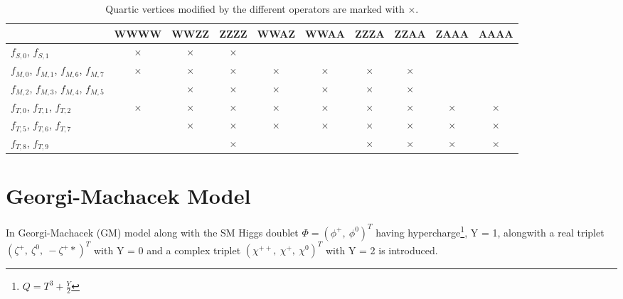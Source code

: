 \begin{table}
\centering
\begin{tabular}[!htbp]{|p{1.8cm} | c  |c  |c  |c  |c  |c  |c | c  |c |}
\hline
    & WWWW & WWZZ & ZZZZ & WWAZ & WWAA & ZZZA & ZZAA & ZAAA & AAAA \\
\hline
$f_{S,0}$, $f_{S,1}$ &$\times$ & $\times$&$\times$ & & & & & & \\
\hline
$f_{M,0}$, $f_{M,1}$, $f_{M,6}$, $f_{M,7}$  &$\times$ &$\times$ &$\times$ &$\times$ &$\times$ &$\times$ &$\times$ & & \\
\hline
$f_{M,2}$, $f_{M,3}$, $f_{M,4}$, $f_{M,5}$  & &$\times$ &$\times$ &$\times$ &$\times$ &$\times$ &$\times$ & & \\
\hline
$f_{T,0}$, $f_{T,1}$, $f_{T,2}$ &$\times$ &$\times$ &$\times$ &$\times$ &$\times$ &$\times$ &$\times$ &$\times$ &$\times$ \\
\hline
$f_{T,5}$, $f_{T,6}$, $f_{T,7}$ & &$\times$ &$\times$ &$\times$ &$\times$ &$\times$ &$\times$ &$\times$ &$\times$ \\
\hline
$f_{T,8}$, $f_{T,9}$  & & &$\times$ & & &$\times$ &$\times$ &$\times$ &$\times$ \\
\hline
\end{tabular}
\caption{Quartic vertices modified by the different operators are marked with $\times$.}
\label{table:aQGC_alloperator}
\end{table}




\section{Georgi-Machacek Model} %
\label{sec:georgi_machacek_model}
In Georgi-Machacek (GM) model along with the SM Higgs doublet $\Phi = (\phi^+,~\phi^0)^T$ having hypercharge\footnote{$Q = T^3 + \frac{Y}{2}$}, Y = 1, alongwith a real triplet $(\zeta^+,~\zeta^0,~-\zeta^+*)^T$ with Y = 0 and a complex triplet $(\chi^{++},~\chi^+,~\chi^0)^T$ with Y = 2 is introduced.

